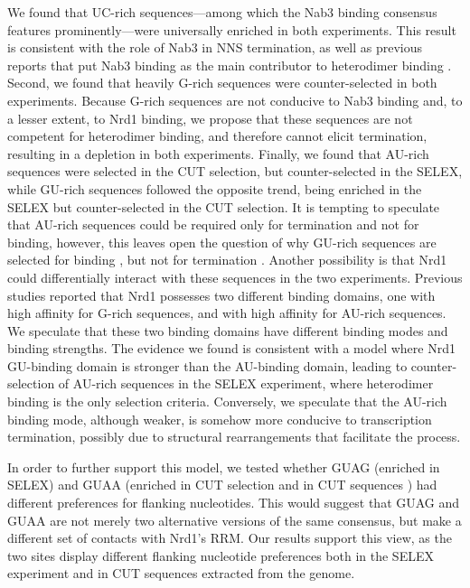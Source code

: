 We found that UC-rich sequences---among which the Nab3 binding consensus features prominently---were universally enriched in both experiments. This result is consistent with the role of Nab3 in NNS termination, as well as previous reports that put Nab3 binding as the main contributor to heterodimer binding \cite{carroll:2007:interaction}. Second, we found that heavily G-rich sequences were counter-selected in both experiments. Because G-rich sequences are not conducive to Nab3 binding and, to a lesser extent, to Nrd1 binding, we propose that these sequences are not competent for heterodimer binding, and therefore cannot elicit termination, resulting in a depletion in both experiments. Finally, we found that AU-rich sequences were selected in the CUT selection, but counter-selected in the SELEX, while GU-rich sequences followed the opposite trend, being enriched in the SELEX but counter-selected in the CUT selection. It is tempting to speculate that AU-rich sequences could be required only for termination and not for binding, however, this leaves open the question of why GU-rich sequences are selected for binding \invitro{}, but not for termination \invivo{}. Another possibility is that Nrd1 could differentially interact with these sequences in the two experiments. Previous \invitro{} studies reported that Nrd1 possesses two different binding domains, one with high affinity for G-rich sequences, and with high affinity for AU-rich sequences. We speculate that these two binding domains have different binding modes and binding strengths. The evidence we found is consistent with a model where Nrd1 GU-binding domain is stronger than the AU-binding domain, leading to counter-selection of AU-rich sequences in the SELEX experiment, where heterodimer binding is the only selection criteria. Conversely, we speculate that the AU-rich binding mode, although weaker, is somehow more conducive to transcription termination, possibly due to structural rearrangements that facilitate the process. 

In order to further support this model, we tested whether GUAG (enriched in SELEX) and GUAA (enriched in CUT selection and in CUT sequences \invivo{}) had different preferences for flanking nucleotides. This would suggest that GUAG and GUAA are not merely two alternative versions of the same consensus, but make a different set of contacts with Nrd1’s RRM. Our results support this view, as the two sites display different flanking nucleotide preferences both in the SELEX experiment and in CUT sequences extracted from the genome. 




